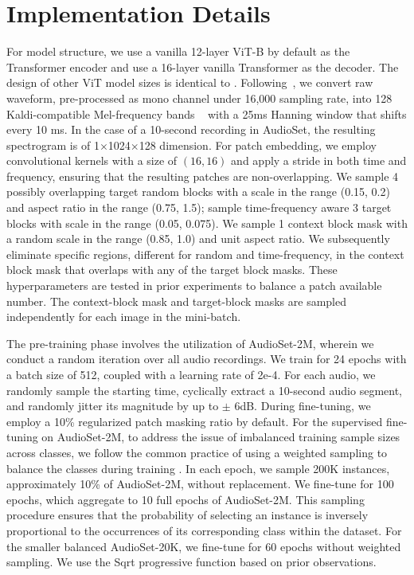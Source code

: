 \documentclass{article}
\begin{document}



\clearpage
\appendix



\section{Implementation Details}

For model structure, we use a vanilla 12-layer ViT-B by default as the Transformer encoder and use a 16-layer vanilla Transformer as the decoder. The design of other ViT model sizes is identical to \cite{huang2022masked}.
Following~\cite{gong2021ast,Nagrani21c}, we convert raw waveform, pre-processed as mono channel under 16,000 sampling rate, into 128 Kaldi-compatible Mel-frequency bands ~\cite{povey2011kaldi} with a 25ms Hanning window that shifts every 10 ms. 
In the case of a 10-second recording in AudioSet, the resulting spectrogram is of 1$\times$1024$\times$128 dimension.
For patch embedding, we employ convolutional kernels with a size of $(16,16)$ and apply a stride in both time and frequency, ensuring that the resulting patches are non-overlapping. We sample 4 possibly overlapping target random blocks with a scale in the range (0.15, 0.2) and aspect ratio in the range (0.75, 1.5); sample time-frequency aware 3 target blocks with scale in the range (0.05, 0.075). We sample 1 context block mask with a random scale in the range (0.85, 1.0) and unit aspect ratio. We subsequently eliminate specific regions, different for random and time-frequency, in the context block mask that overlaps with any of the target block masks. 
These hyperparameters are tested in prior experiments to balance a patch available number. 
The context-block mask and target-block masks are sampled independently for each image in the mini-batch. 



The pre-training phase involves the utilization of AudioSet-2M, wherein we conduct a random iteration over all audio recordings.
We train for 24 epochs with a batch size of 512, coupled with a learning rate of 2e-4.  
For each audio, we randomly sample the starting time, cyclically extract a 10-second audio segment, and randomly jitter its magnitude by up to $\pm$ 6dB. 
During fine-tuning, we employ a 10\% regularized patch masking ratio by default.
For the supervised fine-tuning on AudioSet-2M, to address the issue of imbalanced training sample sizes across classes, we follow the common practice of using a weighted sampling to balance the classes during training \cite{huang2022masked}.  
In each epoch, we sample 200K instances, approximately 10\% of AudioSet-2M, without replacement. We fine-tune for 100 epochs, which aggregate to 10 full epochs of AudioSet-2M. 
This sampling procedure ensures that the probability of selecting an instance is inversely proportional to the occurrences of its corresponding class within the dataset. 
For the smaller balanced AudioSet-20K, we fine-tune for 60 epochs without weighted sampling. We use the Sqrt progressive function based on prior observations. 
\end{document}
